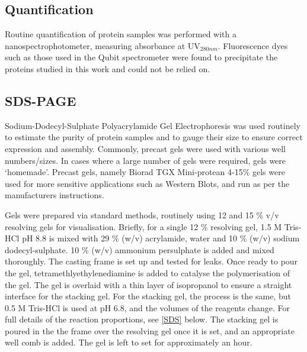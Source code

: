 \subsection{Quantification}
Routine quantification of protein samples was performed with a nanospectrophotometer, measuring absorbance at UV$_{280nm}$. Fluorescence dyes such as those used in the Qubit spectrometer were found to precipitate the proteins studied in this work and could not be relied on.

\subsection{SDS-PAGE}
	Sodium-Dodecyl-Sulphate Polyacrylamide Gel Electrophoresis was used routinely to estimate the purity of protein samples and to gauge their size to ensure correct expression and assembly. Commonly, precast gels were used with various well numbers/sizes. In cases where a large number of gels were required, gels were `homemade'. Precast gels, namely Biorad TGX Mini-protean 4-15\% gels were used for more sensitive applications such as Western Blots, and run as per the manufacturers instructions.

Gels were prepared via standard methods, routinely using 12 and 15 \% v/v resolving gels for visualisation. Briefly, for a single 12 \% resolving gel, 1.5 M Tris-HCl pH 8.8 is mixed with 29 \% (w/v) acrylamide, water and 10 \% (w/v) sodium dodecyl-sulphate. 10 \% (w/v) ammonium persulphate is added and mixed thoroughly. The casting frame is set up and tested for leaks. Once ready to pour the gel, tetramethlyethylenediamine is added to catalyse the polymerisation of the gel. The gel is overlaid with a thin layer of isopropanol to ensure a straight interface for the stacking gel. For the stacking gel, the process is the same, but 0.5 M Tris-HCl is used at pH 6.8, and the volumes of the reagents change. For full details of the reaction proportions, see \vref{SDS} below. The stacking gel is poured in the the frame over the resolving gel once it is set, and an appropriate well comb is added. The gel is left to set for approximately an hour.


